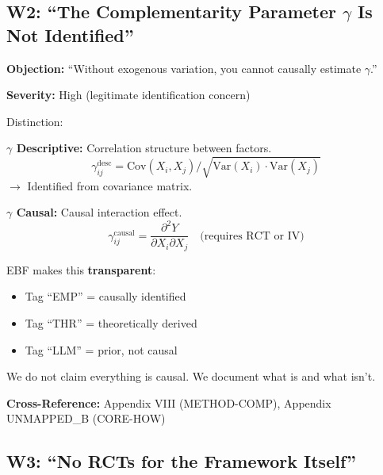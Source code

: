 \subsection{W2: ``The Complementarity Parameter $\gamma$ Is Not Identified''}
\label{sec:da-w2}

\begin{tcolorbox}[colback=gray!5!white, colframe=gray!75!black]
\textbf{Objection:} ``Without exogenous variation, you cannot causally estimate $\gamma$.''

\textbf{Severity:} High (legitimate identification concern)
\end{tcolorbox}

\begin{axiom}
Distinction:

\textbf{$\gamma$ Descriptive:} Correlation structure between factors.
\begin{equation}
\gamma_{ij}^{\text{desc}} = \text{Cov}(X_i, X_j) / \sqrt{\text{Var}(X_i) \cdot \text{Var}(X_j)}
\end{equation}
$\rightarrow$ Identified from covariance matrix.

\textbf{$\gamma$ Causal:} Causal interaction effect.
\begin{equation}
\gamma_{ij}^{\text{causal}} = \frac{\partial^2 Y}{\partial X_i \partial X_j} \quad \text{(requires RCT or IV)}
\end{equation}

EBF makes this \textbf{transparent}:
\begin{itemize}[nosep]
    \item Tag ``EMP'' = causally identified
    \item Tag ``THR'' = theoretically derived
    \item Tag ``LLM'' = prior, not causal
\end{itemize}

We do not claim everything is causal. We document what is and what isn't.
\end{axiom}

\textbf{Cross-Reference:} Appendix VIII (METHOD-COMP), Appendix UNMAPPED_B (CORE-HOW)

\subsection{W3: ``No RCTs for the Framework Itself''}
\label{sec:da-w3}

